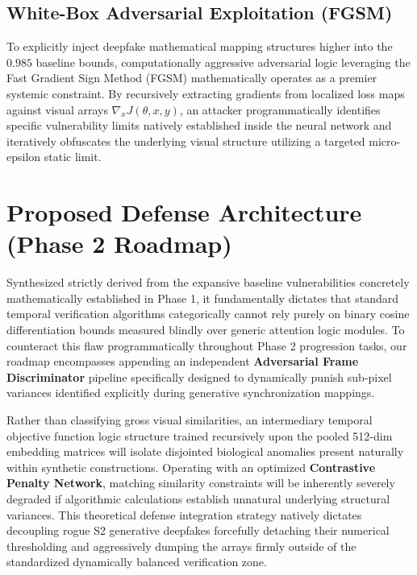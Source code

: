 \documentclass[conference]{IEEEtran}
\begin{document}
\subsection{White-Box Adversarial Exploitation (FGSM)}
To explicitly inject deepfake mathematical mapping structures higher into the $0.985$ baseline bounds, computationally aggressive adversarial logic leveraging the Fast Gradient Sign Method (FGSM) mathematically operates as a premier systemic constraint. By recursively extracting gradients from localized loss maps against visual arrays $\nabla_x J(\theta, x, y)$, an attacker programmatically identifies specific vulnerability limits natively established inside the neural network and iteratively obfuscates the underlying visual structure utilizing a targeted micro-epsilon static limit.

\section{Proposed Defense Architecture (Phase 2 Roadmap)}
Synthesized strictly derived from the expansive baseline vulnerabilities concretely mathematically established in Phase 1, it fundamentally dictates that standard temporal verification algorithms categorically cannot rely purely on binary cosine differentiation bounds measured blindly over generic attention logic modules. To counteract this flaw programmatically throughout Phase 2 progression tasks, our roadmap encompasses appending an independent \textbf{Adversarial Frame Discriminator} pipeline specifically designed to dynamically punish sub-pixel variances identified explicitly during generative synchronization mappings.

Rather than classifying gross visual similarities, an intermediary temporal objective function logic structure trained recursively upon the pooled 512-dim embedding matrices will isolate disjointed biological anomalies present naturally within synthetic constructions. Operating with an optimized \textbf{Contrastive Penalty Network}, matching similarity constraints will be inherently severely degraded if algorithmic calculations establish unnatural underlying structural variances. This theoretical defense integration strategy natively dictates decoupling rogue S2 generative deepfakes forcefully detaching their numerical thresholding and aggressively dumping the arrays firmly outside of the standardized dynamically balanced verification zone.
\end{document}
